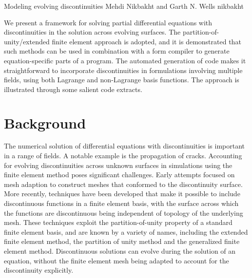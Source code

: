 \newcommand{\vect}[1]{#1} %
\newcommand{\dif}{\, d}
\newcommand{\disc}[1]{\left\llbracket {#1} \right\rrbracket}
\newcommand{\pd}{\partial}

\newcommand{\eps}{\epsilon}

              {Modeling evolving discontinuities}
              {Mehdi Nikbakht and Garth N. Wells}
              {nikbakht}

We present a framework for solving partial differential equations
with discontinuities in the solution across evolving surfaces. The
partition-of-unity/extended finite element approach is adopted, and
it is demonstrated that such methods can be used in combination with
a form compiler to generate equation-specific parts of a program. The
automated generation of code makes it straightforward to incorporate
discontinuities in formulations involving multiple fields, using both
Lagrange and non-Lagrange basis functions.  The approach is illustrated
through some salient code extracts.

\section{Background}

The numerical solution of differential equations with discontinuities is
important in a range of fields. A notable example is the propagation of
cracks. Accounting for evolving discontinuities across \apriori{}
unknown surfaces in simulations using the finite element method poses
significant challenges.  Early attempts focused on mesh adaption to
construct meshes that conformed to the discontinuity surface.  More
recently, techniques have been developed that make it possible to include
discontinuous functions in a finite element basis, with the surface across
which the functions are discontinuous being independent of topology of
the underlying mesh. These techniques exploit the partition-of-unity
property of a standard finite element basis, and are known by a variety
of names, including the extended finite element method, the partition of unity method and the generalized finite element method.  Discontinuous solutions can evolve during the
solution of an equation, without the finite element mesh being adapted
to account for the discontinuity explicitly.

